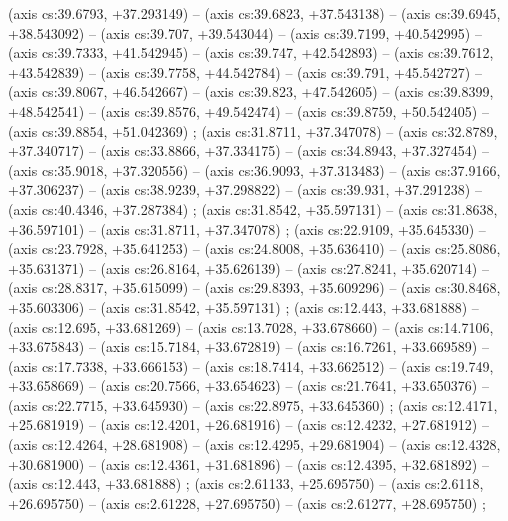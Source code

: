     (axis cs:39.6793,    +37.293149) --  (axis cs:39.6823,    +37.543138) --  (axis cs:39.6945,    +38.543092) --  (axis cs:39.707,    +39.543044) --  (axis cs:39.7199,    +40.542995) --  (axis cs:39.7333,    +41.542945) --  (axis cs:39.747,    +42.542893) --  (axis cs:39.7612,    +43.542839) --  (axis cs:39.7758,    +44.542784) --  (axis cs:39.791,    +45.542727) --  (axis cs:39.8067,    +46.542667) --  (axis cs:39.823,    +47.542605) --  (axis cs:39.8399,    +48.542541) --  (axis cs:39.8576,    +49.542474) --  (axis cs:39.8759,    +50.542405) --  (axis cs:39.8854,    +51.042369) ;
    (axis cs:31.8711,    +37.347078) --  (axis cs:32.8789,    +37.340717) --  (axis cs:33.8866,    +37.334175) --  (axis cs:34.8943,    +37.327454) --  (axis cs:35.9018,    +37.320556) --  (axis cs:36.9093,    +37.313483) --  (axis cs:37.9166,    +37.306237) --  (axis cs:38.9239,    +37.298822) --  (axis cs:39.931,    +37.291238) --  (axis cs:40.4346,    +37.287384) ;
    (axis cs:31.8542,    +35.597131) --  (axis cs:31.8638,    +36.597101) --  (axis cs:31.8711,    +37.347078) ;
    (axis cs:22.9109,    +35.645330) --  (axis cs:23.7928,    +35.641253) --  (axis cs:24.8008,    +35.636410) --  (axis cs:25.8086,    +35.631371) --  (axis cs:26.8164,    +35.626139) --  (axis cs:27.8241,    +35.620714) --  (axis cs:28.8317,    +35.615099) --  (axis cs:29.8393,    +35.609296) --  (axis cs:30.8468,    +35.603306) --  (axis cs:31.8542,    +35.597131) ;
    (axis cs:12.443,    +33.681888) --  (axis cs:12.695,    +33.681269) --  (axis cs:13.7028,    +33.678660) --  (axis cs:14.7106,    +33.675843) --  (axis cs:15.7184,    +33.672819) --  (axis cs:16.7261,    +33.669589) --  (axis cs:17.7338,    +33.666153) --  (axis cs:18.7414,    +33.662512) --  (axis cs:19.749,    +33.658669) --  (axis cs:20.7566,    +33.654623) --  (axis cs:21.7641,    +33.650376) --  (axis cs:22.7715,    +33.645930) --  (axis cs:22.8975,    +33.645360) ;
    (axis cs:12.4171,    +25.681919) --  (axis cs:12.4201,    +26.681916) --  (axis cs:12.4232,    +27.681912) --  (axis cs:12.4264,    +28.681908) --  (axis cs:12.4295,    +29.681904) --  (axis cs:12.4328,    +30.681900) --  (axis cs:12.4361,    +31.681896) --  (axis cs:12.4395,    +32.681892) --  (axis cs:12.443,    +33.681888) ;
    (axis cs:2.61133,    +25.695750) --  (axis cs:2.6118,    +26.695750) --  (axis cs:2.61228,    +27.695750) --  (axis cs:2.61277,    +28.695750) ;
